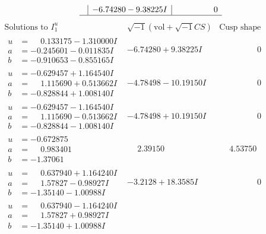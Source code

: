 \documentclass[1p]{elsarticle_modified}
\theoremstyle{definition}
\newcommand{\I}{\sqrt{-1}}
\begin{document}
$$\begin{array}{c|c|c}
 & -6.74280 - 9.38225 I & \phantom{-0.000000 } 0\\
 \hline 
 \end{array}$$\newpage$$\begin{array}{c|c|c}  
\text{Solutions to }I^u_{1}& \I (\text{vol} + \sqrt{-1}CS) & \text{Cusp shape}\\
 \hline 
\begin{aligned}
u &= \phantom{-}0.133175 - 1.310000 I \\
a &= -0.245601 - 0.011835 I \\
b &= -0.910653 - 0.855165 I\end{aligned}
 & -6.74280 + 9.38225 I & \phantom{-0.000000 } 0 \\ \hline\begin{aligned}
u &= -0.629457 + 1.164540 I \\
a &= \phantom{-}1.115690 + 0.513662 I \\
b &= -0.828844 + 1.008140 I\end{aligned}
 & -4.78498 - 10.19150 I & \phantom{-0.000000 } 0 \\ \hline\begin{aligned}
u &= -0.629457 - 1.164540 I \\
a &= \phantom{-}1.115690 - 0.513662 I \\
b &= -0.828844 - 1.008140 I\end{aligned}
 & -4.78498 + 10.19150 I & \phantom{-0.000000 } 0 \\ \hline\begin{aligned}
u &= -0.672875\phantom{ +0.000000I} \\
a &= \phantom{-}0.983401\phantom{ +0.000000I} \\
b &= -1.37061\phantom{ +0.000000I}\end{aligned}
 & \phantom{-}2.39150\phantom{ +0.000000I} & \phantom{-}4.53750\phantom{ +0.000000I} \\ \hline\begin{aligned}
u &= \phantom{-}0.637940 + 1.164240 I \\
a &= \phantom{-}1.57827 - 0.98927 I \\
b &= -1.35140 - 1.00988 I\end{aligned}
 & -3.2128 + 18.3585 I & \phantom{-0.000000 } 0 \\ \hline\begin{aligned}
u &= \phantom{-}0.637940 - 1.164240 I \\
a &= \phantom{-}1.57827 + 0.98927 I \\
b &= -1.35140 + 1.00988 I\end{aligned}

\end{array}$$
\end{document}
